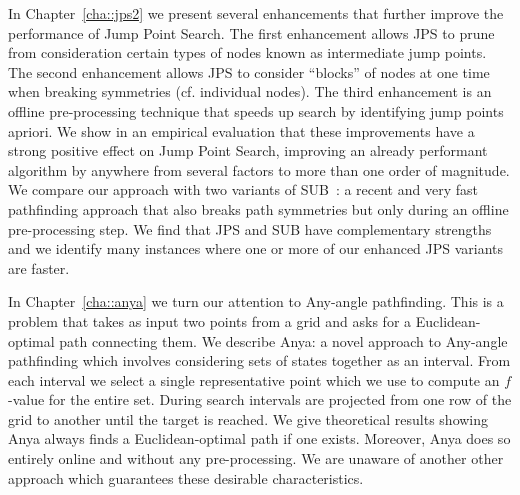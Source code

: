 In Chapter~\ref{cha::jps2} we present several enhancements that further
improve the performance of Jump Point Search. The first enhancement allows JPS
to prune from consideration certain types of nodes known as intermediate jump
points.  The second enhancement allows JPS to consider ``blocks'' of nodes at
one time when breaking symmetries (cf. individual nodes).  The third
enhancement is an offline pre-processing technique that speeds up search by
identifying jump points apriori.  We show in an empirical evaluation that
these improvements have a strong positive effect on Jump Point Search,
improving an already performant algorithm by anywhere from several factors to
more than one order of magnitude.  We compare our approach with two variants
of SUB~\citep{urasKH13}: a recent and very fast pathfinding approach that also
breaks path symmetries but only during an offline pre-processing step. We find
that JPS and SUB have complementary strengths and we identify many instances
where one or more of our enhanced JPS variants are faster.

In Chapter~\ref{cha::anya} we turn our attention to Any-angle pathfinding.
This is a problem that takes as input two points from a grid and asks for a
Euclidean-optimal path connecting them. We describe Anya: a novel approach to
Any-angle pathfinding which involves considering sets of states together as an
interval. From each interval we select a single representative point which we
use to compute an $f$-value for the entire set.  During search intervals are
projected from one row of the grid to another until the target is reached. We
give theoretical results showing Anya always finds a Euclidean-optimal path if
one exists. Moreover, Anya does so entirely online and without any
pre-processing.  We are unaware of another other approach which guarantees
 these desirable characteristics.
